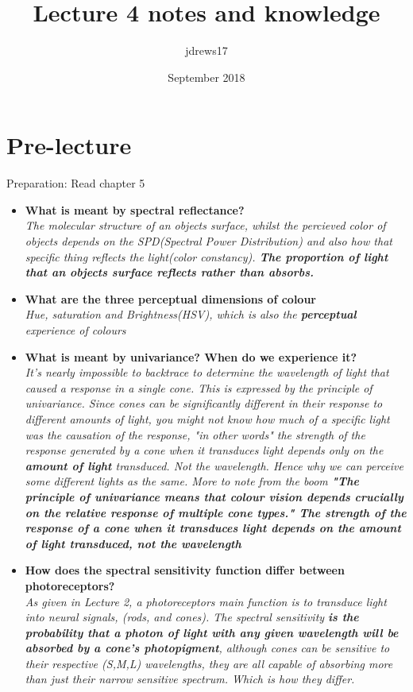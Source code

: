 \documentclass{article}
\title{Lecture 4 notes and knowledge}
\author{jdrews17}
\date{September 2018}
\begin{document}
\maketitle
\newpage

\section{Pre-lecture}
Preparation: Read chapter 5\\
\begin{itemize}
  \item \textbf{What is meant by spectral reflectance?}\\
    \textit{The molecular structure of an objects surface, whilst the percieved color of objects depends on the SPD(Spectral Power Distribution) and also how that specific thing reflects the light(color constancy). \textbf{The proportion of light that an objects surface reflects rather than absorbs.}}
  \item \textbf{What are the three perceptual dimensions of colour}\\
    \textit{Hue, saturation and Brightness(HSV), which is also the \textbf{perceptual} experience of colours}
  \item \textbf{What is meant by univariance? When do we experience it?}\\
    \textit{It's nearly impossible to backtrace to determine the wavelength of light that caused a response in a single cone. This is expressed by the principle of univariance. Since cones can be significantly different in their response to different amounts of light, you might not know how much of a specific light was the causation of the response, "in other words" the strength of the response generated by a cone when it transduces light depends only on the \textbf{amount of light} transduced. Not the wavelength. Hence why we can perceive some different lights as the same. More to note from the boom \textbf{"The principle of univariance means that colour vision depends crucially on the relative response of multiple cone types." The strength of the response of a cone when it transduces light depends on the amount of light transduced, not the wavelength}}
  \item \textbf{How does the spectral sensitivity function differ between photoreceptors?}\\
    \textit{As given in Lecture 2, a photoreceptors main function is to transduce light into neural signals, (rods, and cones). The spectral sensitivity \textbf{is the probability that a photon of light with any given wavelength will be absorbed by a cone's photopigment}, although cones can be sensitive to their respective (S,M,L) wavelengths, they are all capable of absorbing more than just their narrow sensitive spectrum. Which is how they differ.}

\end{itemize}
\end{document}
